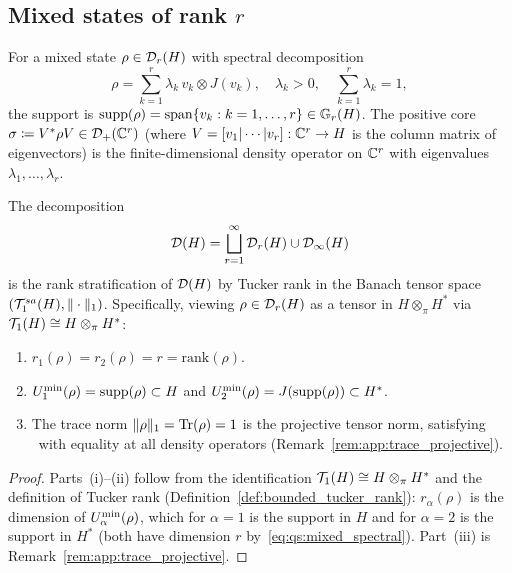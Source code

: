 \subsection*{Mixed states of rank $r$}

For a mixed state $\rho \in \mathcal{D}_{r}(H)$ with spectral decomposition
\begin{equation}
\label{eq:qs:mixed_spectral}
    \rho = \sum_{k=1}^r \lambda_k\, v_k \otimes J(v_k),
    \quad \lambda_k > 0, \quad \sum_{k=1}^r \lambda_k = 1,
\end{equation}
the support is $\mathrm{supp}(\rho) = \mathrm{span}\{v_k : k=1,\ldots,r\} \in \mathbb{G}_{r}(H)$.
The positive core $\sigma \coloneqq V^*\rho V \in \mathcal{D}_+(\mathbb{C}^r)$
(where $V = [v_1|\cdots|v_r]: \mathbb{C}^r \to H$ is the column matrix of
eigenvectors) is the finite-dimensional density operator on $\mathbb{C}^r$
with eigenvalues $\lambda_1, \ldots, \lambda_r$.

\begin{proposition}
\label{prop:qs:rank_tucker}
The decomposition
\begin{equation}
\label{eq:qs:rank_strat}
    \mathcal{D}(H) = \bigsqcup_{r=1}^\infty \mathcal{D}_{r}(H)
    \cup \mathcal{D}_\infty(H)
\end{equation}
is the rank stratification of $\mathcal{D}(H)$ by Tucker rank in the
Banach tensor space $(\mathcal{T}_{1}^{sa}(H), \|\cdot\|_1)$. Specifically, viewing
$\rho \in \mathcal{D}_{r}(H)$ as a tensor in $H \otimes_\pi H^*$ via
$\mathcal{T}_{1}(H) \cong H \otimes_\pi H^*$:
\begin{enumerate}
\item[\textup{(i)}] $r_1(\rho) = r_2(\rho) = r = \mathrm{rank}(\rho)$.
\item[\textup{(ii)}] $U^{\min}_{1}(\rho) = \mathrm{supp}(\rho) \subset H$ and
    $U^{\min}_{2}(\rho) = J(\mathrm{supp}(\rho)) \subset H^*$.
\item[\textup{(iii)}] The trace norm $\|\rho\|_1 = \mathrm{Tr}(\rho) = 1$
    is the projective tensor norm, satisfying \condINJ\ with equality
    at all density operators \textup{(}Remark~\ref{rem:app:trace_projective}\textup{)}.
\end{enumerate}
\end{proposition}

\begin{proof}
Parts~(i)--(ii) follow from the identification $\mathcal{T}_{1}(H) \cong H
\otimes_\pi H^*$ and the definition of Tucker rank
(Definition~\ref{def:bounded_tucker_rank}): $r_\alpha(\rho)$ is the dimension
of $U^{\min}_{\alpha}(\rho)$, which for $\alpha = 1$ is the support in $H$
and for $\alpha = 2$ is the support in $H^*$ (both have dimension $r$
by~\eqref{eq:qs:mixed_spectral}). Part~(iii) is
Remark~\ref{rem:app:trace_projective}.
\end{proof}

